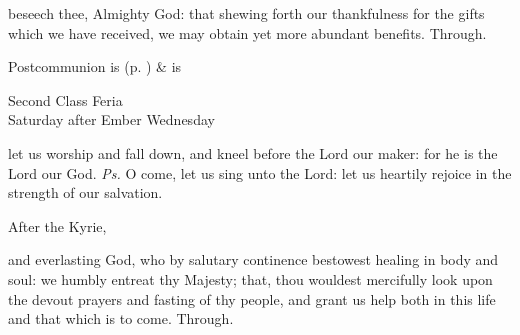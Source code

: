 \postcommunion
{} beseech thee, Almighty God: that shewing forth our thankfulness for the gifts which we have received, we may obtain yet more abundant benefits. Through.
\begin{rubric}
     Postcommunion is  (p. \pageref{SPSaints}) \&  is 
\end{rubric}


%
  
{}
\begin{inhead}
    {Second Class Feria\\
Saturday after Ember Wednesday}
\end{inhead}
\par\noindent
\introit
{} let us worship and fall down, and kneel before the Lord our maker: for he is the Lord our God. \textit{Ps.} O come, let us sing unto the Lord: let us heartily rejoice in the strength of our salvation.

\begin{rubric}
    After the Kyrie,
\end{rubric}
\collect
{} and everlasting God, who by salutary continence bestowest healing in body and soul: we humbly entreat thy Majesty; that, thou wouldest mercifully look upon the devout prayers and fasting of thy people, and grant us help both in this life and that which is to come. Through.

